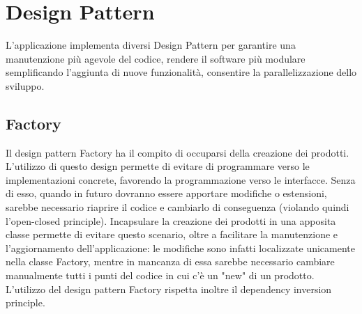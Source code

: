 \chapter{Design Pattern}

L'applicazione implementa diversi Design Pattern per garantire una manutenzione più agevole del codice, rendere il software più modulare semplificando l'aggiunta di nuove funzionalità, consentire la parallelizzazione dello sviluppo.

\section{Factory}

Il design pattern Factory ha il compito di occuparsi della creazione dei prodotti. L'utilizzo di questo design permette di evitare di programmare verso le implementazioni concrete, favorendo la programmazione verso le interfacce. Senza di esso, quando in futuro dovranno essere apportare modifiche o estensioni, sarebbe necessario riaprire il codice e cambiarlo di conseguenza (violando quindi l'open-closed principle). Incapsulare la creazione dei prodotti in una apposita classe permette di evitare questo scenario, oltre a facilitare la manutenzione e l'aggiornamento dell'applicazione: le modifiche sono infatti localizzate unicamente nella classe Factory, mentre in mancanza di essa sarebbe necessario cambiare manualmente tutti i punti del codice in cui c'è un "new" di un prodotto. L'utilizzo del design pattern Factory rispetta inoltre il dependency inversion principle. 

